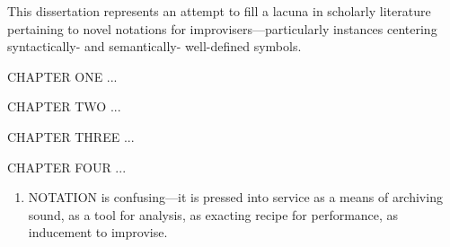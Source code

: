 This dissertation represents an attempt to fill a lacuna in scholarly literature pertaining to novel notations for improvisers---particularly instances centering syntactically- and semantically- well-defined symbols.

CHAPTER ONE ...

CHAPTER TWO ...

CHAPTER THREE ...

CHAPTER FOUR ...

\begin{enumerate}
    \item NOTATION is confusing---it is pressed into service as a means of archiving sound, as a tool for analysis, as exacting recipe for performance, as inducement to improvise.   
\end{enumerate}